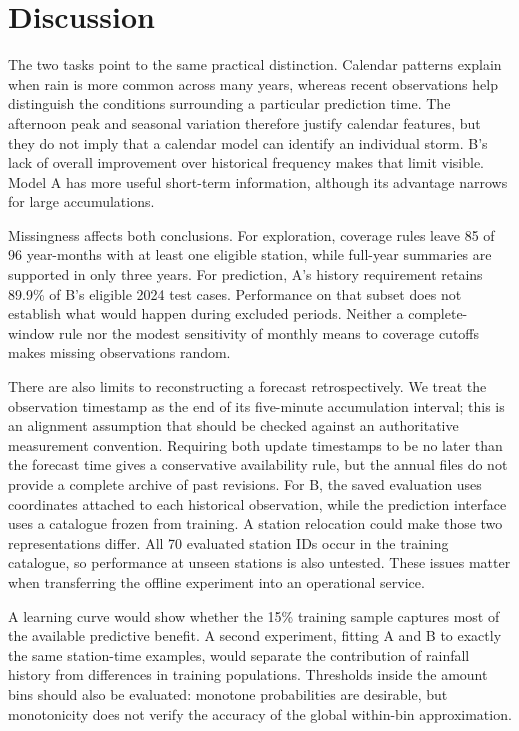 \section{Discussion}

The two tasks point to the same practical distinction. Calendar patterns explain when rain is more common across many years, whereas recent observations help distinguish the conditions surrounding a particular prediction time. The afternoon peak and seasonal variation therefore justify calendar features, but they do not imply that a calendar model can identify an individual storm. B's lack of overall improvement over historical frequency makes that limit visible. Model A has more useful short-term information, although its advantage narrows for large accumulations.

Missingness affects both conclusions. For exploration, coverage rules leave 85 of 96 year-months with at least one eligible station, while full-year summaries are supported in only three years. For prediction, A's history requirement retains 89.9\% of B's eligible 2024 test cases. Performance on that subset does not establish what would happen during excluded periods. Neither a complete-window rule nor the modest sensitivity of monthly means to coverage cutoffs makes missing observations random.

There are also limits to reconstructing a forecast retrospectively. We treat the observation timestamp as the end of its five-minute accumulation interval; this is an alignment assumption that should be checked against an authoritative measurement convention. Requiring both update timestamps to be no later than the forecast time gives a conservative availability rule, but the annual files do not provide a complete archive of past revisions. For B, the saved evaluation uses coordinates attached to each historical observation, while the prediction interface uses a catalogue frozen from training. A station relocation could make those two representations differ. All 70 evaluated station IDs occur in the training catalogue, so performance at unseen stations is also untested. These issues matter when transferring the offline experiment into an operational service.

A learning curve would show whether the 15\% training sample captures most of the available predictive benefit. A second experiment, fitting A and B to exactly the same station-time examples, would separate the contribution of rainfall history from differences in training populations. Thresholds inside the amount bins should also be evaluated: monotone probabilities are desirable, but monotonicity does not verify the accuracy of the global within-bin approximation.

